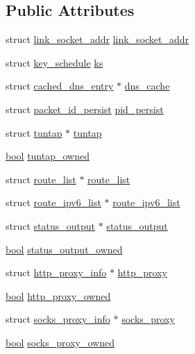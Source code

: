 \subsection*{Public Attributes}
\begin{DoxyCompactItemize}
\item 
struct \hyperlink{structlink__socket__addr}{link\+\_\+socket\+\_\+addr} \hyperlink{structcontext__1_a3f08fbd0447517dc9fefa3e1a30fa26f}{link\+\_\+socket\+\_\+addr}
\item 
struct \hyperlink{structkey__schedule}{key\+\_\+schedule} \hyperlink{structcontext__1_a2add75182e7da9d1d466d37c72e1c276}{ks}
\item 
struct \hyperlink{structcached__dns__entry}{cached\+\_\+dns\+\_\+entry} $\ast$ \hyperlink{structcontext__1_afa252fa776c920089066ddb7bdb16b24}{dns\+\_\+cache}
\item 
struct \hyperlink{structpacket__id__persist}{packet\+\_\+id\+\_\+persist} \hyperlink{structcontext__1_aa20a2b143b3a7f2db2cc9a1af3cdf3e2}{pid\+\_\+persist}
\item 
struct \hyperlink{structtuntap}{tuntap} $\ast$ \hyperlink{structcontext__1_afa52b84db5bb4e12deeabf2e788f7349}{tuntap}
\item 
\hyperlink{automatic_8c_abb452686968e48b67397da5f97445f5b}{bool} \hyperlink{structcontext__1_acae58a5af5e0f65b4963b44c6e9715e5}{tuntap\+\_\+owned}
\item 
struct \hyperlink{structroute__list}{route\+\_\+list} $\ast$ \hyperlink{structcontext__1_a5fce2b35dc960bcdc0cab91b278048f7}{route\+\_\+list}
\item 
struct \hyperlink{structroute__ipv6__list}{route\+\_\+ipv6\+\_\+list} $\ast$ \hyperlink{structcontext__1_a987a02f5590d85e75031d36a6dc2fe5c}{route\+\_\+ipv6\+\_\+list}
\item 
struct \hyperlink{structstatus__output}{status\+\_\+output} $\ast$ \hyperlink{structcontext__1_a52e54589393f891c6eb5aa5c55de22b1}{status\+\_\+output}
\item 
\hyperlink{automatic_8c_abb452686968e48b67397da5f97445f5b}{bool} \hyperlink{structcontext__1_a8eb1f3e8ba4ab0d8167a7d232dcff498}{status\+\_\+output\+\_\+owned}
\item 
struct \hyperlink{structhttp__proxy__info}{http\+\_\+proxy\+\_\+info} $\ast$ \hyperlink{structcontext__1_aa41670c0d47426f2b7630ecde06d509e}{http\+\_\+proxy}
\item 
\hyperlink{automatic_8c_abb452686968e48b67397da5f97445f5b}{bool} \hyperlink{structcontext__1_a4df958b48a25d1ceec216de0287cc7dd}{http\+\_\+proxy\+\_\+owned}
\item 
struct \hyperlink{structsocks__proxy__info}{socks\+\_\+proxy\+\_\+info} $\ast$ \hyperlink{structcontext__1_af266db9e924917e0dab9ca0f01259df1}{socks\+\_\+proxy}
\item 
\hyperlink{automatic_8c_abb452686968e48b67397da5f97445f5b}{bool} \hyperlink{structcontext__1_aaac4b2b8b2b667ffe53c32dcfb137144}{socks\+\_\+proxy\+\_\+owned}
\end{DoxyCompactItemize}


